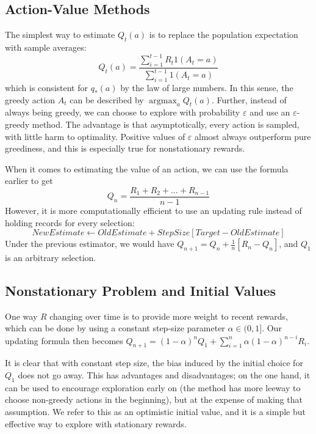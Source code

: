 \documentclass[12pt, reqno]{article}
\theoremstyle{plain}    \newtheorem{theorem}{Theorem}[section]
\theoremstyle{plain}    \newtheorem{lemma}[theorem]{Lemma}
\theoremstyle{plain}    \newtheorem{claim}[theorem]{Claim}
\theoremstyle{plain}    \newtheorem{definition}{Definition}[section]
\theoremstyle{plain}    \newtheorem{proposition}[theorem]{Proposition}
\theoremstyle{plain}    \newtheorem{corollary}[theorem]{Corollary}
\theoremstyle{plain}    \newtheorem{example}[definition]{Example}
\DeclareMathOperator*{\argmax}{argmax}
\newcommand{\eps}{\varepsilon}
\numberwithin{equation}{section}
\begin{document}
\subsection{Action-Value Methods}
The simplest way to estimate \(Q_t(a)\) is to replace the population expectation
with sample averages:
\[Q_t(a) = \frac{\sum_{i=1}^{t-1}R_t 1(A_t = a)}{\sum_{i=1}^{t-1} 1(A_t = a)}\]
which is consistent for \(q_*(a)\) by the law of large numbers. In this sense,
the greedy action \(A_t\) can be described by \(\argmax_a Q_t(a)\). Further,
instead of always being greedy, we can choose to explore with probability
\(\eps\) and use an \(\eps\)-greedy method. The advantage is that
asymptotically, every action is sampled, with little harm to optimality.
Positive values of \(\eps\) almost always outperform pure greediness, and this
is especially true for nonstationary rewards. 

When it comes to estimating the value of an action, we can use the formula
earlier to get 
\[Q_n = \frac{R_1 + R_2 + \dots + R_{n-1}}{n-1}\]
However, it is more computationally
efficient to use an updating rule instead of holding records for every
selection: 
\[\mathit{NewEstimate} \leftarrow \mathit{OldEstimate} +
\mathit{StepSize}[\mathit{Target} - \mathit{OldEstimate}]\]
Under the previous estimator, we would have \(Q_{n+1} = Q_n + \frac{1}{n}[R_n -
Q_n]\), and \(Q_1\) is an arbitrary selection. 
\subsection{Nonstationary Problem and Initial Values}
One way \(R\) changing over time is to provide more weight to recent rewards,
which can be done by using a constant step-size parameter \(\alpha \in (0,1]\).
Our updating formula then becomes \(Q_{n+1} = (1- \alpha)^n Q_1 +
\sum_{i=1}^{n}\alpha(1-\alpha)^{n-i} R_i\). 

It is clear that with constant step size, the bias induced by the initial choice
for \(Q_1\) does not go away. This has advantages and disadvantages; on the one
hand, it can be used to encourage exploration early on (the method has more
leeway to choose non-greedy actions in the beginning), but at the expense of
making that assumption. We refer to this as an optimistic initial value, and it
is a simple but effective way to explore with stationary rewards. 
\end{document}
